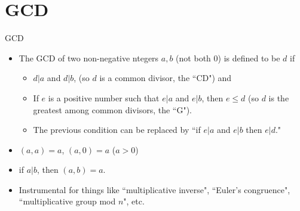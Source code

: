 \documentclass[ %
 usenames,dvipsnames,
aspectratio=169,11pt ]{beamer}
\newenvironment{stepitemize}{\begin{itemize}[<+->]}{\end{itemize} }
\begin{document}
\section{GCD}
\begin{frame}{GCD}
\begin{stepitemize}
    \item The GCD of two non-negative ntegers $a, b$ (not both 0) is defined to be $d$ if
    \begin{itemize}
        \item $d|a$ and $d|b$, (so $d$ is a common divisor, the ``CD") and
    \item If $e$ is a positive number such that $e|a$ and $e|b$, then $e\leq d$ (so $d$ is the greatest among common divisors, the ``G").
    \item The previous condition can be replaced by
    ``if $e|a$ and $e|b$ then $e|d$."
    \end{itemize}
\item $(a,a)=a$, $(a,0)=a$ ($a>0$)
\item if $a|b$, then $(a,b)=a$.
\item Instrumental for things like ``multiplicative inverse", ``Euler's congruence", ``multiplicative group mod $n$", etc.

\end{stepitemize}
\end{frame}
\end{document}
